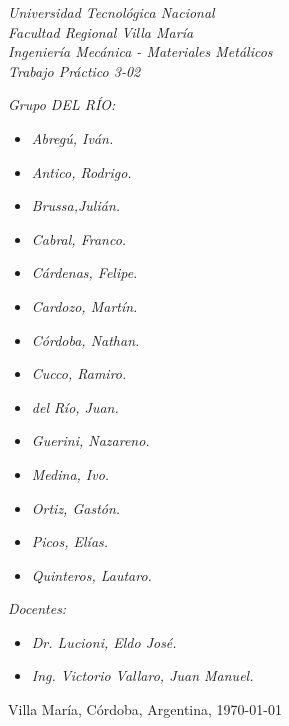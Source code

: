 \begin{titlepage}
	
	\begin{center}
		{\huge \textit{Universidad Tecnológica Nacional}}\\
        \vspace{0.5cm}
		{\LARGE \textit{Facultad Regional Villa María}}\\
		\vspace{1.5cm}
        {\LARGE{\textit{Ingeniería Mecánica - Materiales Metálicos}}}\\
		\vspace{1.5cm}
        \LARGE{\textit{Trabajo Práctico 3-02}}
	\end{center}
	
	\vfill

    \textit{Grupo DEL RÍO:}
	\begin{itemize}
		\item \textit{Abregú, Iván.}
		\item \textit{Antico, Rodrigo.}
		\item \textit{Brussa,Julián.}
		\item \textit{Cabral, Franco.}
        \item \textit{Cárdenas, Felipe.}
        \item \textit{Cardozo, Martín.}
        \item \textit{Córdoba, Nathan.}
        \item \textit{Cucco, Ramiro.}
        \item \textit{del Río, Juan.}
        \item \textit{Guerini, Nazareno.}
        \item \textit{Medina, Ivo.}
        \item \textit{Ortiz, Gastón.}
        \item \textit{Picos, Elías.}
        \item \textit{Quinteros, Lautaro.}
	\end{itemize}
    
	\textit{Docentes:}
	\begin{itemize}
		\item \textit{Dr. Lucioni, Eldo José.}
		\item \textit{Ing. Victorio Vallaro, Juan Manuel.}
	\end{itemize}
	\begin{center}
		Villa María, Córdoba, Argentina, \today
	\end{center}
	
\end{titlepage}
